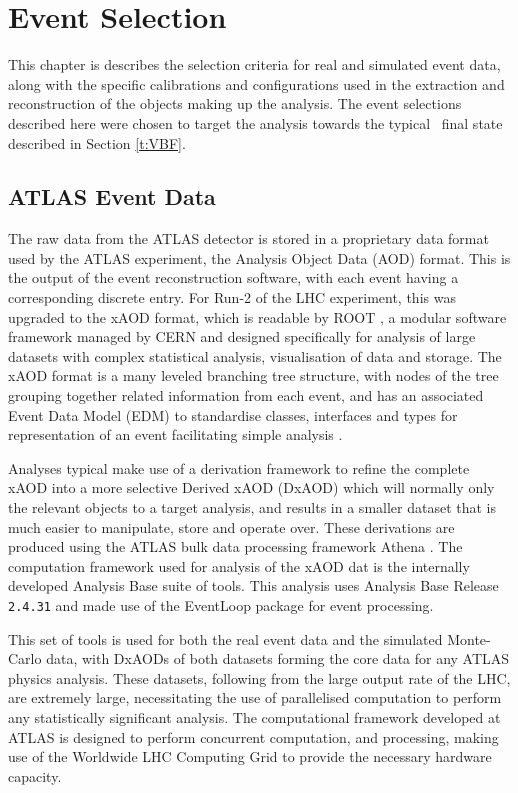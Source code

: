 \chapter{Event Selection}\label{c:ES}

	This chapter is describes the selection criteria for real and simulated event data, along with the specific calibrations and configurations used in the extraction and reconstruction of the objects making up the analysis. The event selections described here were chosen to target the analysis towards the typical \VBFHBB\, final state described in Section \ref{t:VBF}.

	\section{ATLAS Event Data}

	The raw data from the ATLAS detector is stored in a proprietary data format used by the ATLAS experiment, the Analysis Object Data (AOD) format. This is the output of the event reconstruction software, with each event having a corresponding discrete entry. For Run-2 of the LHC experiment, this was upgraded to the xAOD format, which is readable by ROOT \cite{ROOT}, a modular software framework managed by CERN and designed specifically for analysis of large datasets with complex statistical analysis, visualisation of data and storage. The xAOD format is a many leveled branching tree structure, with nodes of the tree grouping together related information from each event, and has an associated Event Data Model (EDM) to standardise classes, interfaces and types for representation of an event facilitating simple analysis \cite{xAOD}.

	Analyses typical make use of a derivation framework to refine the complete xAOD into a more selective Derived xAOD (DxAOD) which will normally only the relevant objects to a target analysis, and results in a smaller dataset that is much easier to manipulate, store and operate over. These derivations are produced using the ATLAS bulk data processing framework Athena \cite{athena}. The computation framework used for analysis of the xAOD dat is the internally developed Analysis Base suite of tools. This analysis uses Analysis Base Release \texttt{2.4.31} and made use of the EventLoop package for event processing.

	This set of tools is used for both the real event data and the simulated Monte-Carlo data, with DxAODs of both datasets forming the core data for any ATLAS physics analysis. These datasets, following from the large output rate of the LHC, are extremely large, necessitating the use of parallelised computation to perform any statistically significant analysis. The computational framework developed at ATLAS is designed to perform concurrent computation, and processing, making use of the Worldwide LHC Computing Grid \cite{grid} to provide the necessary hardware capacity.


